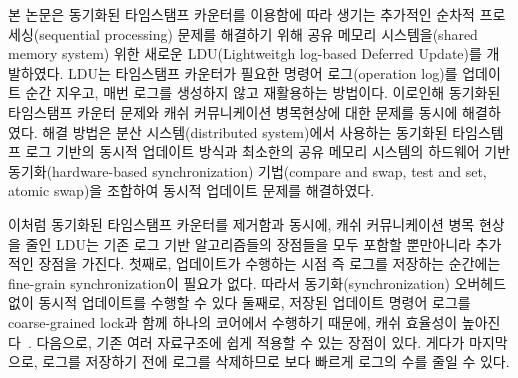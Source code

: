%
본 논문은 동기화된 타임스탬프 카운터를 이용함에 따라 생기는 추가적인 순차적 프로세싱(sequential processing) 문제를
해결하기 위해 공유 메모리 시스템을(shared memory system) 위한 새로운 LDU(Lightweitgh log-based
Deferred Update)를 개발하였다.
LDU는 타임스탬프 카운터가 필요한 명령어 로그(operation log)를 업데이트 순간 지우고,
 매번 로그를 생성하지 않고 재활용하는 방법이다.
이로인해 동기화된 타임스탬프 카운터 문제와 캐쉬 커뮤니케이션 병목현상에 대한 문제를 동시에 해결하였다.
해결 방법은 분산 시스템(distributed system)에서 사용하는 동기화된 타임스템프 로그 기반의 
동시적 업데이트 방식과 최소한의 공유 메모리 시스템의 하드웨어 기반 동기화(hardware-based
synchronization) 기법(compare and swap, test and set, atomic swap)을 조합하여 동시적 업데이트
문제를 해결하였다.

이처럼 동기화된 타임스탬프 카운터를 제거함과 동시에, 캐쉬 커뮤니케이션 병목 현상을 줄인
LDU는 기존 로그 기반 알고리즘들의 장점들을 모두 포함할 뿐만아니라 추가적인 장점을 가진다.
첫째로, 업데이트가 수행하는 시점 즉 로그를 저장하는 순간에는 fine-grain synchronization이 필요가 없다. 
따라서 동기화(synchronization) 오버헤드 없이 동시적 업데이트를 수행할 수 있다
둘째로, 저장된 업데이트 명령어 로그를 coarse-grained lock과 함께 하나의 코어에서 수행하기
때문에, 캐쉬 효율성이 높아진다~\cite{Hendler2010FC}.
다음으로, 기존 여러 자료구조에 쉽게 적용할 수 있는 장점이 있다.
게다가 마지막으로, 로그를 저장하기 전에 로그를 삭제하므로 보다 빠르게 로그의 수를 줄일 수 있다. 


